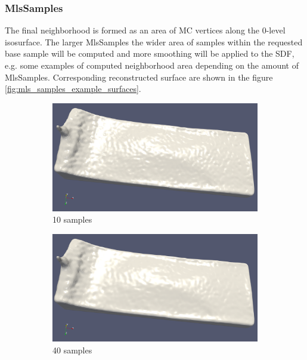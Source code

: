 \subsubsection{MlsSamples}
The final neighborhood is formed as an area of MC vertices along the 0-level isosurface. The larger MlsSamples the wider area of samples within the requested base sample will be computed and more smoothing will be applied to the SDF, e.g. some examples of computed neighborhood area depending on the amount of MlsSamples. Corresponding reconstructed surface are shown in the figure \ref{fig:mls_samples_example_surfaces}.
\begin{figure}[H]
	\begin{center}
		\begin{subfigure}[b]{0.4\textwidth}
			\includegraphics[width=\textwidth]{figures/MlsSamples10.png}
			\caption{10 samples}
		\end{subfigure}
		\begin{subfigure}[b]{0.4\textwidth}
			\includegraphics[width=\textwidth]{figures/MlsSamples40.png}
			\caption{40 samples}
		\end{subfigure}
		\begin{subfigure}[b]{0.4\textwidth}

\end{subfigure}
\end{center}
\end{figure}
